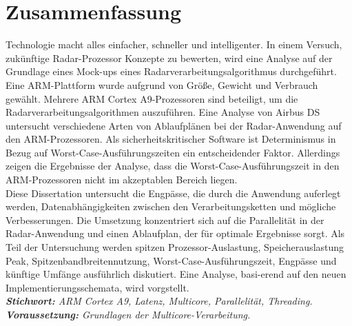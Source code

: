\chapter*{Zusammenfassung}
\label{chap:abstract_de}

Technologie macht alles einfacher, schneller und intelligenter. In einem Versuch, zukünftige Radar-Prozessor Konzepte zu bewerten, wird eine Analyse auf der Grundlage eines Mock-ups eines Radarverarbeitungsalgorithmus durchgeführt. Eine ARM-Plattform wurde aufgrund von Größe, Gewicht und Verbrauch gewählt. Mehrere ARM Cortex A9-Prozessoren sind beteiligt, um die Radarverarbeitungsalgorithmen auszuführen. Eine Analyse von Airbus DS untersucht verschiedene Arten von Ablaufplänen bei der Radar-Anwendung auf den ARM-Prozessoren. Als sicherheitskritischer Software ist Determinismus in Bezug auf Worst-Case-Ausführungszeiten ein entscheidender Faktor. Allerdings zeigen die Ergebnisse der Analyse, dass die Worst-Case-Ausführungszeit in den ARM-Prozessoren nicht im akzeptablen Bereich liegen. \\

Diese Dissertation untersucht die Engpässe, die durch die Anwendung auferlegt werden, Datenabhängigkeiten zwischen den Verarbeitungsketten und mögliche Verbesserungen. Die Umsetzung konzentriert sich auf die Parallelität in der Radar-Anwendung und einen Ablaufplan, der für  optimale Ergebnisse sorgt. Als Teil der Untersuchung werden spitzen Prozessor-Auslastung, Speicherauslastung Peak, Spitzenbandbreitennutzung, Worst-Case-Ausführungszeit, Engpässe und künftige Umfänge ausführlich diskutiert. Eine Analyse, basi-erend auf den neuen Implementierungsschemata, wird vorgstellt. \\


\noindent
\textsl{\textbf{Stichwort:} ARM Cortex A9, Latenz, Multicore, Parallelität, Threading.} \\

\noindent
\textsl{\textbf{Voraussetzung:} Grundlagen der Multicore-Verarbeitung.}\\

